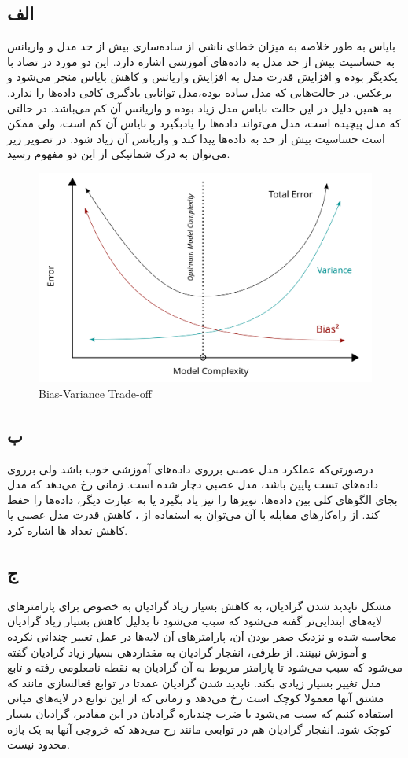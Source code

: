 \documentclass[12pt]{article}
\begin{document}
	\subsection{الف}
	بایاس به طور خلاصه به میزان خطای ناشی از ساده‌سازی بیش از حد مدل و واریانس به حساسیت بیش از حد مدل به داده‌های آموزشی اشاره دارد. این دو مورد در تضاد با یکدیگر بوده و افزایش قدرت مدل به افزایش واریانس و کاهش بایاس منجر می‌شود و برعکس. در حالت‌هایی که مدل ساده بوده،‌مدل توانایی یادگیری کافی داده‌ها را ندارد. به همین دلیل در این حالت بایاس مدل زیاد بوده و واریانس آن کم می‌باشد. در حالتی که مدل پیچیده است، مدل می‌تواند داده‌ها را یادبگیرد و بایاس آن کم است، ولی ممکن است حساسیت بیش از حد به داده‌ها پیدا کند و واریانس آن زیاد شود. در تصویر زیر می‌توان به درک شماتیکی از این دو مفهوم رسید.
	\begin{figure}[H]
		\centering
		\includegraphics[scale=0.3]{pic_1}
		\caption{Bias-Variance Trade-off}
	\end{figure}
	\subsection{ب}
	درصورتی‌که عملکرد مدل عصبی برروی داده‌های آموزشی خوب باشد ولی برروی داده‌های تست پایین باشد، مدل عصبی دچار  شده است.  زمانی رخ می‌دهد که مدل بجای الگو‌های کلی بین داده‌ها، نویزها را نیز یاد بگیرد یا به عبارت دیگر، داده‌ها را حفظ کند. از راه‌کارهای مقابله با آن می‌توان به استفاده از ، کاهش قدرت مدل عصبی یا کاهش تعداد  ها اشاره کرد.
	\subsection{ج}
	مشکل ناپدید شدن گرادیان، به کاهش بسیار زیاد گرادیان به خصوص برای پارامترهای لایه‌های ابتدایی‌تر گفته می‌شود که سبب می‌شود تا بدلیل کاهش بسیار زیاد گرادیان محاسبه شده و نزدیک صفر بودن آن، پارامترهای آن لایه‌ها در عمل تغییر چندانی نکرده و آموزش نبینند. از طرفی، انفجار گرادیان به مقداردهی بسیار زیاد گرادیان گفته می‌شود که سبب می‌شود تا پارامتر مربوط به آن گرادیان به نقطه نامعلومی رفته و تابع مدل تغییر بسیار زیادی بکند. 
	\newline
	ناپدید شدن گرادیان عمدتا در توابع فعالسازی مانند  که مشتق آنها معمولا کوچک است رخ می‌دهد و زمانی که از این توابع در لایه‌های میانی استفاده کنیم که سبب می‌شود با ضرب چندباره گرادیان در این مقادیر، گرادیان بسیار کوچک شود.
	\newline
	انفجار گرادیان هم در توابعی مانند  رخ می‌دهد که خروجی آنها به یک بازه محدود نیست. 
\end{document}
